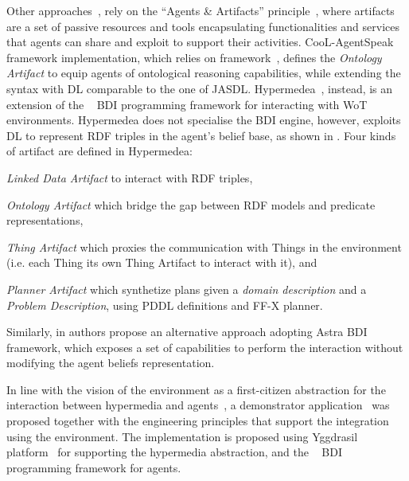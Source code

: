 \documentclass[
]{ceurart}
\begin{document}
%
Other approaches~\cite{DBLP:journals/wias/MascardiABBR14,DBLP:conf/www/CharpenayZLB22, DBLP:conf/semweb/ONeillBBC21, DBLP:conf/emas/CiorteaBR18},
rely on the ``Agents \& Artifacts'' principle~\cite{DBLP:conf/promas/RicciVO05}, 
where artifacts are a set of passive resources and tools encapsulating functionalities and services
that agents can share and exploit to support their activities.
%
CooL-AgentSpeak~\cite{DBLP:journals/wias/MascardiABBR14} framework implementation,
which relies on \cartago{} framework~\cite{DBLP:books/sp/09/RicciPVO09},
defines the \emph{Ontology Artifact} to equip agents of ontological reasoning capabilities,
while extending the syntax with \ac{DL} comparable to the one of JASDL.
%
Hypermedea~\cite{DBLP:conf/www/CharpenayZLB22}, instead,
is an extension of the \jacamo{}~\cite{BOISSIER2013747} \ac{BDI} programming framework
for interacting with \ac{WoT} environments.
%
Hypermedea does not specialise the \ac{BDI} engine, 
however,
exploits \ac{DL} to represent \ac{RDF} triples in the agent's belief base, 
as shown in .
%
Four kinds of artifact are defined in Hypermedea: 
\begin{inlinelist}
  \item \textit{Linked Data Artifact} to interact with \ac{RDF} triples,
  \item \textit{Ontology Artifact} which bridge the gap between \ac{RDF} models and predicate representations,
  \item \textit{Thing Artifact} which proxies the communication with Things in the environment (i.e. each Thing its own Thing Artifact to interact with it), and
  \item \textit{Planner Artifact} which synthetize plans given a \textit{domain description} and a \textit{Problem Description}, using PDDL definitions and FF-X planner. 
\end{inlinelist}
%


Similarly,
in \cite{DBLP:conf/semweb/ONeillBBC21} authors propose an alternative approach adopting Astra \ac{BDI} framework, 
which exposes a set of capabilities to perform the interaction without modifying the agent beliefs representation.

In line with the vision of the environment as a first-citizen abstraction for the interaction between hypermedia and agents~\cite{DBLP:conf/www/CharpenayZLB22},
a demonstrator application~\cite{DBLP:conf/emas/CiorteaBR18} was proposed together with the engineering principles that support the integration using the environment.
%
The implementation is proposed using Yggdrasil platform~\cite{ciortea2018emas} for supporting the hypermedia abstraction,
and the \jacamo{}~\cite{BOISSIER2013747} \ac{BDI} programming framework for agents.
\end{document}
